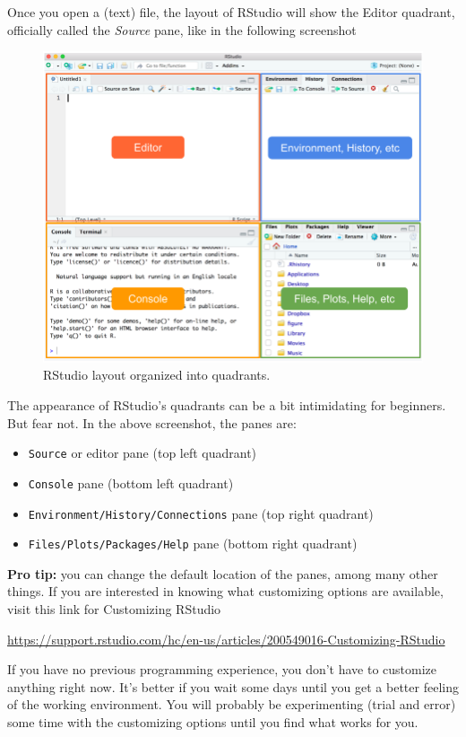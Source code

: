\documentclass[
]{book}
\begin{document}
Once you open a (text) file, the layout of RStudio will show the Editor
quadrant, officially called the \emph{Source} pane, like in the following screenshot

\begin{figure}

{\centering \includegraphics[width=0.8\linewidth]{images/rstudio/rstudio-quadrants} 

}

\caption{RStudio layout organized into quadrants.}\label{fig:unnamed-chunk-26}
\end{figure}

The appearance of RStudio's quadrants can be a bit intimidating for beginners.
But fear not. In the above screenshot, the panes are:

\begin{itemize}
\item
  \texttt{Source} or editor pane (top left quadrant)
\item
  \texttt{Console} pane (bottom left quadrant)
\item
  \texttt{Environment/History/Connections} pane (top right quadrant)
\item
  \texttt{Files/Plots/Packages/Help} pane (bottom right quadrant)
\end{itemize}

\textbf{Pro tip:} you can change the default location of the panes, among many other
things. If you are interested in knowing what customizing options are available,
visit this link for Customizing RStudio

\url{https://support.rstudio.com/hc/en-us/articles/200549016-Customizing-RStudio}

If you have no previous programming experience, you don't have to customize
anything right now. It's better if you wait some days until you get a better
feeling of the working environment. You will probably be experimenting (trial
and error) some time with the customizing options until you find what works for
you.
\end{document}
